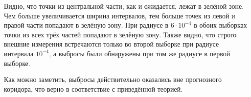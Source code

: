 Видно, что точки из центральной части, как и ожидается, лежат в зелёной зоне. Чем больше увеличивается ширина интервалов, тем больше точек из левой и правой части попадают в зелёную зону. При радиусе в $6 \cdot 10 ^ {-4}$ в обоих выборках точки из всех трёх частей попадают в зелёную зону.
Также видно, что строго внешние измерения встречаются только во второй выборке при радиусе интервала $10 ^ {-4}$, а выбросы были обнаружены при том же радиусе в первой выборке.

Как можно заметить, выбросы действительно оказались вне прогнозного коридора, что верно в соответствие с приведённой теорией.